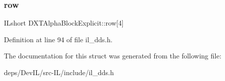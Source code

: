 \subsubsection{\texorpdfstring{row}{row}}
{\footnotesize\ttfamily I\+Lshort D\+X\+T\+Alpha\+Block\+Explicit\+::row\mbox{[}4\mbox{]}}



Definition at line 94 of file il\+\_\+dds.\+h.



The documentation for this struct was generated from the following file\+:\begin{DoxyCompactItemize}
\item 
deps/\+Dev\+I\+L/src-\/\+I\+L/include/il\+\_\+dds.\+h\end{DoxyCompactItemize}
